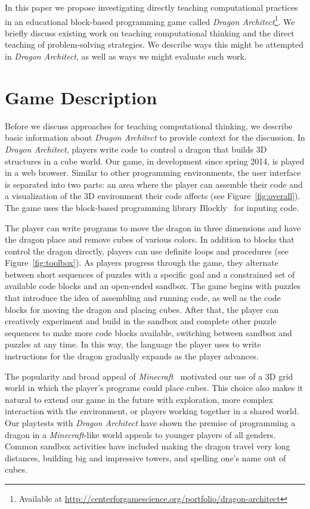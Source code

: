 \documentclass[conference]{IEEEtran}
\begin{document}
In this paper we propose investigating directly teaching computational practices in an educational block-based programming game called \emph{Dragon Architect}\footnote{Available at \url{http://centerforgamescience.org/portfolio/dragon-architect}}. 
We briefly discuss existing work on teaching computational thinking and the direct teaching of problem-solving strategies. 
We describe ways this might be attempted in \emph{Dragon Architect}, as well as ways we might evaluate such work. 

\section{Game Description}

Before we discuss approaches for teaching computational thinking, we describe basic information about \emph{Dragon Architect} to provide context for the discussion.
In \emph{Dragon Architect}, players write code to control a dragon that builds 3D structures in a cube world.
Our game, in development since spring 2014, is played in a web browser.
Similar to other programming environments, the user interface is separated into two parts: an area where the player can assemble their code and a visualization of the 3D environment their code affects (see Figure~\ref{fig:overall}). 
The game uses the block-based programming library Blockly~\cite{blockly} for inputing code.

The player can write programs to move the dragon in three dimensions and have the dragon place and remove cubes of various colors. 
In addition to blocks that control the dragon directly, players can use definite loops and procedures (see Figure~\ref{fig:toolbox}).
As players progress through the game, they alternate between short sequences of puzzles with a specific goal and a constrained set of available code blocks and an open-ended sandbox.
The game begins with puzzles that introduce the idea of assembling and running code, as well as the code blocks for moving the dragon and placing cubes.
After that, the player can creatively experiment and build in the sandbox and complete other puzzle sequences to make more code blocks available, switching between sandbox and puzzles at any time. 
In this way, the language the player uses to write instructions for the dragon gradually expands as the player advances.

The popularity and broad appeal of \emph{Minecraft}~\cite{minecraft} motivated our use of a 3D grid world in which the player's programs could place cubes.
This choice also makes it natural to extend our game in the future with exploration, more complex interaction with the environment, or players working together in a shared world.
Our playtests with \emph{Dragon Architect} have shown the premise of programming a dragon in a \emph{Minecraft}-like world appeals to younger players of all genders.
Common sandbox activities have included making the dragon travel very long distances, building big and impressive towers, and spelling one's name out of cubes.
\end{document}
